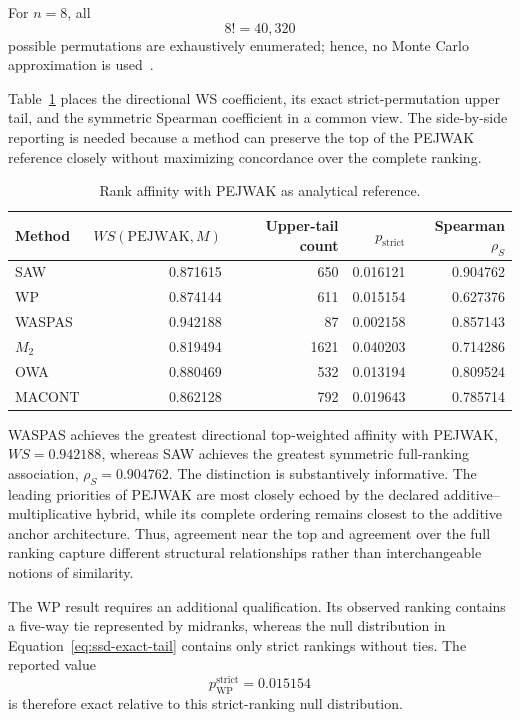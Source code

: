 \documentclass[reqno,11pt]{amsart}
\theoremstyle{definition}
\theoremstyle{plain}
\theoremstyle{remark}
\begin{document}
For $n=8$, all
\[
8!=40{,}320
\]
possible permutations are exhaustively enumerated; hence, no Monte Carlo
approximation is used~\cite{Salabun2026}.

Table~\ref{tab:rank-affinity} places the directional WS coefficient, its exact strict-permutation upper tail, and the symmetric Spearman coefficient in a common view. The side-by-side reporting is needed because a method can preserve the top of the PEJWAK reference closely without maximizing concordance over the complete ranking.

\begin{table}[htbp]
\centering
\small
\caption{Rank affinity with PEJWAK as analytical reference.}
\label{tab:rank-affinity}
\begin{tabular}{lrrrr}
\toprule
Method & $WS(\mathrm{PEJWAK},M)$ & Upper-tail count & $p_{\mathrm{strict}}$ & Spearman $\rho_S$\\
\midrule
SAW&0.871615&650&0.016121&0.904762\\
WP&0.874144&611&0.015154&0.627376\\
WASPAS&0.942188&87&0.002158&0.857143\\
$M_2$&0.819494&1621&0.040203&0.714286\\
OWA&0.880469&532&0.013194&0.809524\\
MACONT&0.862128&792&0.019643&0.785714\\
\bottomrule
\end{tabular}
\end{table}

WASPAS achieves the greatest directional top-weighted affinity with
PEJWAK, \(WS=0.942188\), whereas SAW achieves the greatest symmetric
full-ranking association, \(\rho_S=0.904762\). The distinction is
substantively informative. The leading priorities of PEJWAK are most
closely echoed by the declared additive--multiplicative hybrid, while its
complete ordering remains closest to the additive anchor architecture.
Thus, agreement near the top and agreement over the full ranking capture
different structural relationships rather than interchangeable notions
of similarity.

The WP result requires an additional qualification. Its observed ranking
contains a five-way tie represented by midranks, whereas the null
distribution in Equation~\eqref{eq:ssd-exact-tail} contains only strict
rankings without ties. The reported value
\[
p_{\mathrm{WP}}^{\mathrm{strict}}=0.015154
\]
is therefore exact relative to this strict-ranking null distribution.
\end{document}
